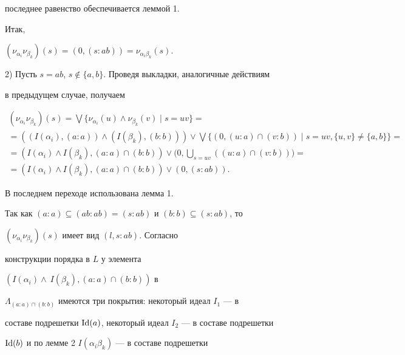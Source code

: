 последнее равенство обеспечивается леммой 1.





Итак,


$(\nu_{\alpha_i}\nu_{\beta_k})(s)=(0,(s:ab))=\nu_{\alpha_i\beta_k}(s)$.





2) Пусть $s=ab$, $s\notin\{a,b\}$. Проведя выкладки, аналогичные действиям


в предыдущем случае, получаем


\begin{multline*}


(\nu_{\alpha_i}\nu_{\beta_k})(s)=\bigvee\{\nu_{\alpha_i}(u)\wedge


\nu_{\beta_k}(v)\mid s=uv\}= \\


%


=((I(\alpha_i),(a:a))\wedge(I(\beta_k),(b:b)))\vee\bigvee


\{(0,(u:a)\cap(v:b))\mid s=uv,\{u,v\}\ne\{a,b\}\}=\\


%


=(I(\alpha_i)\wedge


I(\beta_k),(a:a)\cap(b:b))\vee\Big(0,\bigcup_{s=uv}((u:a)\cap(v:b))\Big)= \\


%


=(I(\alpha_i)\wedge I(\beta_k),(a:a)\cap(b:b))\vee(0,(s:ab)).


\end{multline*}


В последнем переходе использована лемма 1.





Так как $(a:a)\subseteq(ab:ab)=(s:ab)$ и $(b:b)\subseteq(s:ab)$, то


$(\nu_{\alpha_i}\nu_{\beta_k})(s)$ имеет вид $(l,s:ab)$. Согласно


конструкции порядка в $L$ у элемента


$(I(\alpha_i)\wedge\ I(\beta_k),(a:a)\cap(b:b))$ в


$\Lambda_{(a:a)\cap(b:b)}$ имеются три покрытия: некоторый идеал $I_1$ --- в


составе подрешетки $\operatorname{Id}(a)$, некоторый идеал $I_2$ --- в составе подрешетки


$\operatorname{Id}(b)$ и по лемме 2\; $I(\alpha_i\beta_k)$ --- в составе подрешетки


